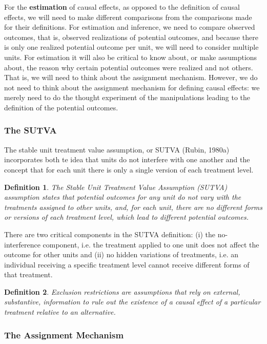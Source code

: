 \documentclass[12pt]{article}
\theoremstyle{definition}
\newtheorem{definition}{Definition}[section]
\begin{document}
For the \textbf{estimation} of causal effects, as opposed to the definition of causal effects, we will need to make different comparisons from the comparisons made for their definitions. For  estimation and inference, we need to compare observed outcomes, that is, observed realizations of potential outcomes, and because there is only one realized potential outcome per unit, we will need to consider multiple units. For estimation it will also be critical to know about, or make assumptions about, the reason why certain potential outcomes were realized and not others. That is, we will need to think about the assignment mechanism. However, we do not need to think about the assignment mechanism for defining causal effects: we merely need to do the thought experiment of the manipulations leading to the definition of the potential outcomes.

\subsubsection{The SUTVA}
The stable unit treatment value assumption, or SUTVA (Rubin, 1980a) incorporates both te idea that units do not interfere with one another and the concept that for each unit there is only a single version of each treatment level.

\theoremstyle{definition}
\begin{definition}\textit{The Stable Unit Treatment Value Assumption (SUTVA) assumption states that potential outcomes for any unit do not vary with the treatments assigned to other units, and, for each unit, there are no different forms or versions of each treatment level, which lead to different potential outcomes.}
\end{definition}

There are two critical components in the SUTVA definition: (i) the no-interference component, i.e. the treatment applied to one unit does not affect the outcome for other units and (ii) no hidden variations of treatments, i.e. an individual receiving a specific treatment level cannot receive different forms of that treatment.

\theoremstyle{definition}
\begin{definition}\textit{Exclusion restrictions are assumptions that rely on external, substantive, information to rule out the existence of a causal effect of a particular treatment relative to an alternative.}
\end{definition}

\subsubsection{The Assignment Mechanism}
\end{document}
